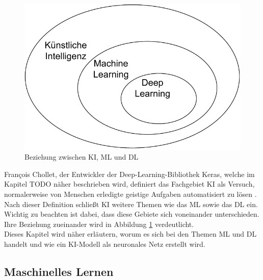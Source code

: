 \begin{figure}[H]
    \centering
    \includegraphics[width=\textwidth/2]{abbildungen/KI_ML_DL.pdf}
    \caption{Beziehung zwischen \acs{KI}, \acs{ML} und \acs{DL} \cite[S.22]{DL_PY}}
    \label{fig:KI_ML_DL}
\end{figure} 

François Chollet, der Entwickler der Deep-Learning-Bibliothek Keras, welche im Kapitel TODO näher beschrieben wird, definiert
das Fachgebiet \ac{KI} als \glqq [den] Versuch, normalerweise von Menschen erledigte geistige Aufgaben automatisiert zu lösen\grqq{} \cite[S.22]{DL_PY}.
Nach dieser Definition schließt \ac{KI} weitere Themen wie das \ac{ML} sowie das \ac{DL} ein. Wichtig zu beachten ist dabei,
dass diese Gebiete sich voneinander unterschieden. Ihre Beziehung zueinander wird in Abbildung \ref*{fig:KI_ML_DL} verdeutlicht.\\

Dieses Kapitel wird näher erläutern, worum es sich bei den Themen \ac{ML} und \ac{DL} handelt und wie ein \ac{KI}-Modell als neuronales Netz erstellt wird.

\subsection{Maschinelles Lernen}

